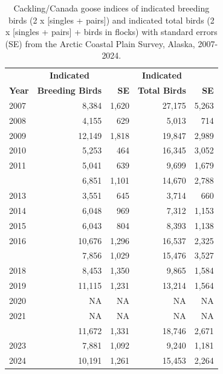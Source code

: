 \documentclass[
]{article}
\begin{document}
\begingroup\fontsize{10}{12}\selectfont

\begin{longtable}[t]{lrrrr}

\caption{\label{tbl-CCGO}Cackling/Canada goose indices of indicated
breeding birds (2 x {[}singles + pairs{]}) and indicated total birds (2
x {[}singles + pairs{]} + birds in flocks) with standard errors (SE)
from the Arctic Coastal Plain Survey, Alaska, 2007-2024.}

\tabularnewline

\\
\toprule
\multicolumn{1}{c}{\textbf{ }} & \multicolumn{1}{c}{\textbf{Indicated}} & \multicolumn{1}{c}{\textbf{ }} & \multicolumn{1}{c}{\textbf{Indicated}} & \multicolumn{1}{c}{\textbf{ }} \\
\cmidrule(l{3pt}r{3pt}){2-2} \cmidrule(l{3pt}r{3pt}){4-4}
\textbf{Year} & \textbf{Breeding Birds} & \textbf{SE} & \textbf{Total Birds} & \textbf{SE}\\
\midrule
2007 & 8,384 & 1,620 & 27,175 & 5,263\\
2008 & 4,155 & 629 & 5,013 & 714\\
2009 & 12,149 & 1,818 & 19,847 & 2,989\\
2010 & 5,253 & 464 & 16,345 & 3,052\\
2011 & 5,041 & 639 & 9,699 & 1,679\\
\addlinespace
2012 & 6,851 & 1,101 & 14,670 & 2,788\\
2013 & 3,551 & 645 & 3,714 & 660\\
2014 & 6,048 & 969 & 7,312 & 1,153\\
2015 & 6,043 & 804 & 8,393 & 1,138\\
2016 & 10,676 & 1,296 & 16,537 & 2,325\\
\addlinespace
2017 & 7,856 & 1,029 & 15,476 & 3,527\\
2018 & 8,453 & 1,350 & 9,865 & 1,584\\
2019 & 11,115 & 1,231 & 13,214 & 1,564\\
2020 & NA & NA & NA & NA\\
2021 & NA & NA & NA & NA\\
\addlinespace
2022 & 11,672 & 1,331 & 18,746 & 2,671\\
2023 & 7,881 & 1,092 & 9,240 & 1,181\\
2024 & 10,191 & 1,261 & 15,453 & 2,264\\
\bottomrule

\end{longtable}
\end{document}
